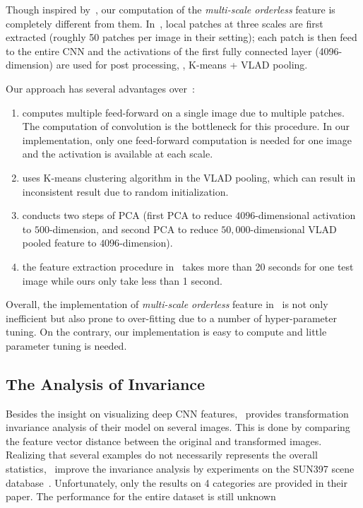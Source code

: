 \documentclass[10pt,twocolumn,letterpaper]{article}
\begin{document}
Though inspired by~\cite{Gong14}, our computation of the \textit{multi-scale orderless} feature is completely different from them. In~\cite{Gong14}, local patches at three scales are first extracted (roughly 50 patches per image in their setting); each patch is then feed to the entire CNN and the activations of the first fully connected layer (4096-dimension) are used for post processing, \ie, K-means + VLAD pooling. 

Our approach has several advantages over~\cite{Gong14}:
\begin{enumerate}
\item \cite{Gong14} computes multiple feed-forward on a single image due to multiple patches. The computation of convolution is the bottleneck for this procedure. In our implementation, only one feed-forward computation is needed for one image and the activation is available at each scale.
\item \cite{Gong14} uses K-means clustering algorithm in the VLAD pooling, which can result in inconsistent result due to random initialization. 
\item \cite{Gong14} conducts two steps of PCA (first PCA to reduce $4096$-dimensional activation to $500$-dimension, and second PCA to reduce $50,000$-dimensional VLAD pooled feature to $4096$-dimension). 
\item the feature extraction procedure in~\cite{Gong14} takes more than 20 seconds for one test image while ours only take less than 1 second. 
\end{enumerate} 

Overall, the implementation of \textit{multi-scale orderless} feature in~\cite{Gong14} is not only inefficient but also prone to over-fitting due to a number of hyper-parameter tuning. On the contrary, our implementation is easy to compute and little parameter tuning is needed. 

\subsection{The Analysis of Invariance}

Besides the insight on visualizing deep CNN features,~\cite{visual_cnn} provides transformation invariance analysis of their model on several images. This is done by comparing the feature vector distance between the original and transformed images. Realizing that several examples do not necessarily represents the overall statistics,~\cite{Gong14} improve the invariance analysis by experiments on the SUN397 scene database~\cite{SUN397}. Unfortunately, only the results on 4 categories are provided in their paper. The performance for the entire dataset is still unknown
\end{document}
